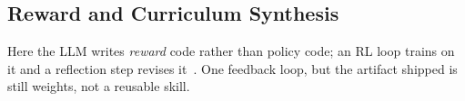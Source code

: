 \subsection{Reward and Curriculum Synthesis}
\label{sec:reward}

Here the LLM writes \emph{reward} code rather than policy code; an RL loop trains on it
and a reflection step revises it~\citep{eureka}. One feedback loop, but the artifact
shipped is still weights, not a reusable skill.
